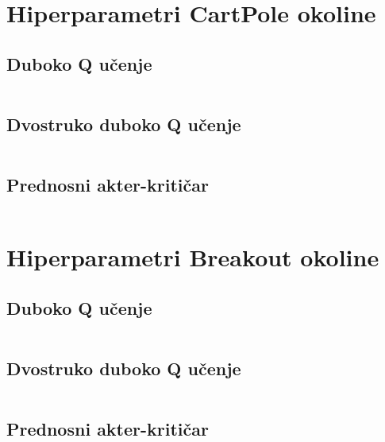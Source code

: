 \appendix
\chapter{Hiperparametri CartPole okoline}
\label{appendix:cartpole-hiperparams}

\section{Duboko Q učenje}

\begin{listing}[H]
    \inputminted{yaml}{hiperparams/dqn-cartpole.yml}
    \label{yaml:dqn-cartpole}
\end{listing}

\section{Dvostruko duboko Q učenje}

\begin{listing}[H]
    \inputminted{yaml}{hiperparams/ddqn-cartpole.yml}
    \label{yaml:ddqn-cartpole}
\end{listing}

\section{Prednosni akter-kritičar}

\begin{listing}[H]
    \inputminted{yaml}{hiperparams/a2c-cartpole.yml}
    \label{yaml:a2c-cartpole}
\end{listing}

\chapter{Hiperparametri Breakout okoline}
\label{appendix:breakout-hipperparams}

\section{Duboko Q učenje}

\begin{listing}[H]
    \inputminted{yaml}{hiperparams/dqn-breakout.yml}
    \label{yaml:dqn-breakout}
\end{listing}

\section{Dvostruko duboko Q učenje}

\begin{listing}[H]
    \inputminted{yaml}{hiperparams/ddqn-breakout.yml}
    \label{yaml:ddqn-breakout}
\end{listing}

\section{Prednosni akter-kritičar}

\begin{listing}[H]
    \inputminted{yaml}{hiperparams/a2c-breakout.yml}
    \label{yaml:a2c-breakout}
\end{listing}
